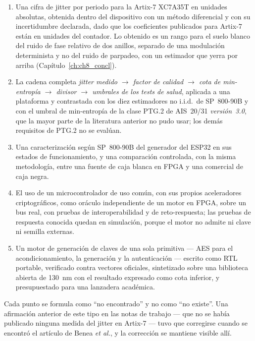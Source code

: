 \begin{enumerate}
\item Una cifra de jitter por periodo para la Artix-7 XC7A35T en
unidades absolutas, obtenida dentro del dispositivo con un método
diferencial y con su
incertidumbre declarada, dado que los coeficientes publicados para
Artix-7 están en unidades del contador. Lo obtenido es un rango para el
suelo blanco del ruido de fase relativo de dos anillos, separado de una
modulación determinista y no del ruido de parpadeo, con un estimador que
yerra por arriba (Capítulo~\ref{ch:ch8_concl}).
\item La cadena completa \emph{jitter medido $\to$ factor de calidad $\to$
cota de min-entropía $\to$ divisor $\to$ umbrales de los tests de salud},
aplicada a una plataforma y contrastada con los diez estimadores no
i.i.d.\ de SP~800-90B y con el umbral de min-entropía de la clase PTG.2
de AIS~20/31
\emph{versión~3.0}, que la mayor parte de la literatura anterior no pudo
usar; los demás requisitos de PTG.2 no se evalúan.
\item Una caracterización según SP~800-90B del generador del ESP32 en sus
estados de funcionamiento, y una comparación controlada, con la misma
metodología, entre una fuente de caja blanca en FPGA y una comercial de
caja negra.
\item El uso de un microcontrolador de uso común, con sus propios
aceleradores criptográficos, como oráculo independiente de un motor en
FPGA, sobre un bus real, con pruebas de interoperabilidad y de
reto-respuesta; las pruebas de respuesta conocida quedan en simulación,
porque el motor no admite ni clave ni semilla externas.
\item Un motor de generación de claves de una sola primitiva --- AES para
el acondicionamiento, la generación y la autenticación --- escrito como
RTL portable, verificado contra vectores oficiales, sintetizado sobre una
biblioteca abierta de 130~nm con el resultado expresado como cota
inferior, y presupuestado para una lanzadera académica.
\end{enumerate}

Cada punto se formula como ``no encontrado'' y no como ``no existe''. Una
afirmación anterior de este tipo en las notas de trabajo --- que no se
había publicado ninguna medida del jitter en Artix-7 --- tuvo que
corregirse cuando se encontró el artículo de Benea \emph{et al.}, y la
corrección se mantiene visible allí.

